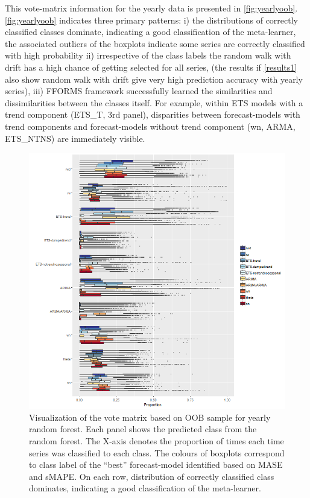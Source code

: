 \documentclass[11pt,a4paper,]{article}
\begin{document}
This vote-matrix information for the yearly data is presented in \autoref{fig:yearlyoob}. \autoref{fig:yearlyoob} indicates three primary patterns: i) the distributions of correctly classified classes dominate, indicating a good classification of the meta-learner, the associated outliers of the boxplots indicate some series are correctly classified with high probability ii) irrespective of the class labels the random walk with drift has a high chance of getting selected for all series,
(the results if \autoref{results1} also show random walk with drift give very high prediction accuracy with yearly series), iii) FFORMS framework successfully learned the similarities and dissimilarities between the classes itself. For example, within ETS models with a trend component (ETS\_T, 3rd panel), disparities between forecast-models with trend components and forecast-models without trend component (wn, ARMA, ETS\_NTNS) are immediately visible.

\begin{figure}
\centering
\includegraphics{figures/yearlyoob-1.png}
\caption{\label{fig:yearlyoob}Visualization of the vote matrix based on OOB sample for yearly random forest. Each panel shows the predicted class from the random forest. The X-axis denotes the proportion of times each time series was classified to each class. The colours of boxplots correspond to class label of the ``best'' forecast-model identified based on MASE and sMAPE. On each row, distribution of correctly classified class dominates, indicating a good classification of the meta-learner.}
\end{figure}
\end{document}
